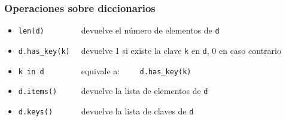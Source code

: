 \documentclass{beamer}
\begin{document}
\begin{frame}[fragile]
\frametitle{Operaciones sobre diccionarios}

\begin{footnotesize}
  \begin{itemize}
  \item \verb|len(d)        | devuelve el número de elementos de \verb|d|
  \item \verb|d.has_key(k)  | devuelve 1 si existe la clave \verb|k| en
    \verb|d|, 0 en caso contrario
  \item \verb|k in d        | equivale a: \verb|    d.has_key(k)|
  \item \verb|d.items()     | devuelve la lista de elementos de \verb|d|
  \item \verb|d.keys()      | devuelve la lista de claves de \verb|d|
  \end{itemize}
\end{footnotesize}
\end{frame}






%

\end{document}
